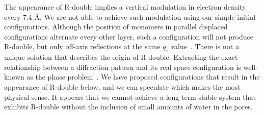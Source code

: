 \documentclass[journal=jpcbfk,manuscript=article]{achemso}
\begin{document}
  
  The appearance of R-double implies a vertical modulation in electron density
  every 7.4 \AA. We are not able to achieve such modulation using our simple
  initial configurations. Although the position of monomers in parallel displaced
  configurations alternate every other layer, such a configuration will not
  produce R-double, but only off-axis reflections at the same $q_z$
  value~\cite{harburn_atlas_1975}. There is not a unique solution that describes
  the origin of R-double. Extracting the exact relationship between a diffraction
  pattern and its real space configuration is well-known as the phase
  problem~\cite{taylor_phase_2003}. We have proposed configurations that
  result in the appearance of R-double below, and we can speculate which makes
  the most physical sense. It appears that we cannot achieve a long-term stable
  system that exhibits R-double without the inclusion of small amounts of water
  in the pores.
  
 
\end{document}
